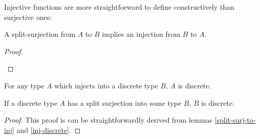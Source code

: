 \begin{definition}[Injections]
  Injective functions are more straightforward to define constructively than
  surjective ones:
  \begin{agdalisting}
  \end{agdalisting} \vspace{-1.5\baselineskip}
  \begin{agdalisting}
  \end{agdalisting}
\end{definition}
\begin{lemma} \label{split-surj-to-inj}
  A split-surjection from \(A\) to \(B\) implies an injection from \(B\) to
  \(A\).
  \begin{agdalisting}
  \end{agdalisting}
\end{lemma}
\begin{proof} \let\qed\relax

  \begin{minipage}[t]{.9\textwidth}\vspace{-\baselineskip}
    \begin{agdalisting*}
    \end{agdalisting*}
  \end{minipage}
\end{proof}
\begin{lemma} \label{inj-discrete}
  For any type \(A\) which injects into a discrete type \(B\), \(A\) is
  discrete.
  \begin{agdalisting}
  \end{agdalisting}
\end{lemma}

\begin{lemma} \label{discrete-surj}
  If a discrete type \(A\) has a split surjection into some type \(B\), \(B\) is
  discrete.
  \begin{agdalisting}
  \end{agdalisting}
\end{lemma}
\begin{proof}
  This proof is can be straightforwardly derived from lemmas
  \ref{split-surj-to-inj} and \ref{inj-discrete}.
\end{proof}

